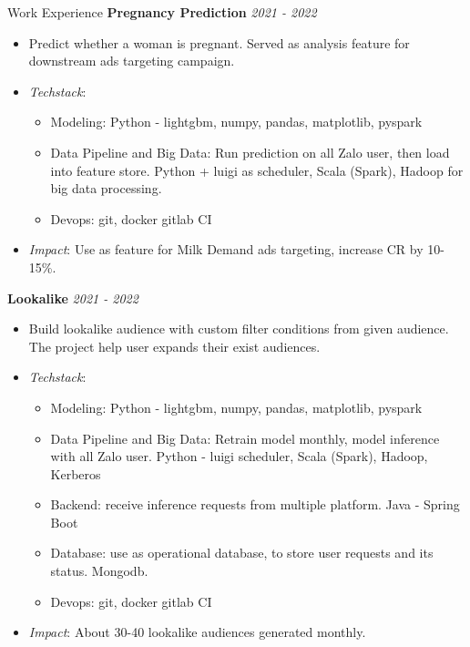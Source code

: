 \documentclass{resume} %
\begin{document}
\begin{rSection}{Work Experience}
\textbf{Pregnancy Prediction } \hfill {\em \textit{2021 - 2022}}
\begin{itemize}
    \item Predict whether a woman is pregnant. Served as analysis feature for downstream ads targeting campaign.
    \item \textit{Techstack}:
    \begin{itemize}
        \item Modeling: Python - lightgbm, numpy, pandas, matplotlib, pyspark
        \item Data Pipeline and Big Data: Run prediction on all Zalo user, then load into feature store. Python + luigi as scheduler, Scala (Spark), Hadoop for big data processing.
        \item Devops: git, docker gitlab CI
    \end{itemize} 
    \item \textit{Impact}: Use as feature for Milk Demand ads targeting, increase CR by 10-15\%.
\end{itemize}

\textbf{Lookalike} \hfill {\em \textit{2021 - 2022}}
\begin{itemize}
    \item Build lookalike audience with custom filter conditions from given audience. The project help user expands their exist audiences.
    \item \textit{Techstack}:
    \begin{itemize}
        \item Modeling: Python - lightgbm, numpy, pandas, matplotlib, pyspark
        \item Data Pipeline and Big Data: Retrain model monthly,  model inference with all Zalo user. Python - luigi scheduler, Scala (Spark), Hadoop, Kerberos
        \item Backend: receive inference requests from multiple platform. Java - Spring Boot
        \item Database: use as operational database, to store user requests and its status. Mongodb.
        \item Devops: git, docker gitlab CI
    \end{itemize} 
    \item \textit{Impact}: About 30-40 lookalike audiences generated monthly.
\end{itemize}



\end{rSection}
\end{document}

